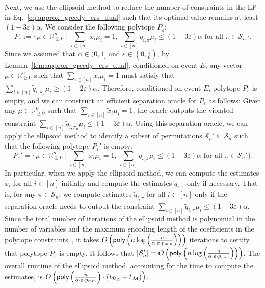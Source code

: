 \documentclass[11pt]{article}
\newcommand{\D}{\mathcal D}
\newcommand{\M}{{\mathcal M}}
\newcommand{\cS}{{\mathcal S}}
\newcommand{\eps}{\varepsilon}
\newcommand{\poly}{\textnormal{\sffamily poly}}
\newcommand{\R}{{\mathbb R}}
\begin{document}
Next, we use the ellipsoid method to reduce the number of constraints in the LP in Eq.~\eqref{eq:approx_greedy_crs_dual} such that its optimal value remains at least $(1-3\eps)\alpha$. We consider the following polytope $P_{\eps}$:
\[
    P_{\eps}:=\{\mu\in\R_{\ge0}^n\mid \sum_{i\in[n]}\tilde{x}_i\mu_i=1,\,\sum_{i\in[n]} \tilde{q}_{i,\pi}\mu_i\le (1-3\eps)\alpha\textrm{ for all }\pi\in\cS_n\}.
\]
Since we assumed that $\alpha\in(0,1]$ and $\eps\in\left(0,\frac{1}{6}\right)$, by Lemma~\ref{lem:approx_greedy_crs_dual}, conditioned on event $E$, any vector $\mu\in\R_{\ge0}^n$ such that $\sum_{i\in[n]}\tilde{x}_i\mu_i=1$ must satisfy that $\sum_{i\in[n]} \tilde{q}_{i,\pi_{\mu}}\mu_i\ge (1-2\eps)\alpha$. Therefore, conditioned on event $E$, polytope $P_{\eps}$ is empty, and we can construct an efficient separation oracle for $P_{\eps}$ as follows: Given any $\mu\in\R_{\ge0}^n$ such that $\sum_{i\in[n]}\tilde{x}_i\mu_i=1$, the oracle outputs the violated constraint $\sum_{i\in[n]} \tilde{q}_{i,\pi_{\mu}}\mu_i\le (1-3\eps)\alpha$. Using this separation oracle, we can apply the ellipsoid method to identify a subset of permutations $\cS_n'\subseteq\cS_n$ such that the following polytope $P_{\eps}'$ is empty:
\[
    P_{\eps}'=\{\mu\in\R_{\ge0}^n\mid \sum_{i\in[n]}\tilde{x}_i\mu_i=1,\,\sum_{i\in[n]} \tilde{q}_{i,\pi}\mu_i\le (1-3\eps)\alpha\textrm{ for all }\pi\in\cS_n'\}.
\]
In particular, when we apply the ellipsoid method, we can compute the estimates $\tilde{x}_i$ for all $i\in[n]$ initially and compute the estimates $\tilde{q}_{i,\pi}$ only if necessary. That is, for any $\pi\in\cS_n$, we compute estimates $\tilde{q}_{i,\pi}$ for all $i\in[n]$ only if the separation oracle needs to output the constraint $\sum_{i\in[n]} \tilde{q}_{i,\pi}\mu_i\le (1-3\eps)\alpha$. Since the total number of iterations of the ellipsoid method is polynomial in the number of variables and the maximum encoding length of the coefficients in the polytope constraints~\citep{grotschel2012geometric}, it takes $O\left(\poly\left(n\log\left(\frac{n}{\alpha\cdot\eps\cdot p_{\min}}\right)\right)\right)$ iterations to certify that polytope $P_{\eps}$ is empty. It follows that $|\cS_n'|=O\left(\poly\left(n\log\left(\frac{n}{\alpha\cdot\eps\cdot p_{\min}}\right)\right)\right)$. The overall runtime of the ellipsoid method, accounting for the time to compute the estimates, is $O\left(\poly\left(\frac{n}{\alpha\cdot\eps\cdot p_{\min}}\right)\cdot(t_{\D_{A}}+t_{\M})\right)$.
\end{document}
